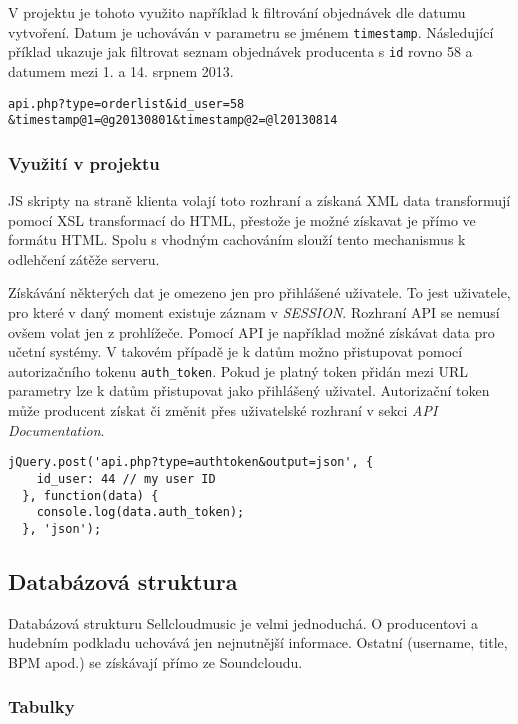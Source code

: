 \documentclass[12pt]{article}
\begin{document}
V projektu je tohoto využito například k filtrování objednávek dle datumu vytvoření. Datum je uchováván v parametru se jménem \verb|timestamp|. Následující příklad ukazuje jak filtrovat seznam objednávek producenta s \texttt{id} rovno 58 a datumem mezi 1. a 14. srpnem 2013.

\begin{lstlisting}
api.php?type=orderlist&id_user=58
&timestamp@1=@g20130801&timestamp@2=@l20130814
\end{lstlisting}

\subsubsection{Využití v projektu}

JS skripty na straně klienta volají toto rozhraní a získaná XML data transformují pomocí XSL transformací do HTML, přestože je možné získavat je přímo ve formátu HTML. Spolu s vhodným cachováním slouží tento mechanismus k odlehčení zátěže serveru.

Získávání některých dat je omezeno jen pro přihlášené uživatele. To jest uživatele, pro které v daný moment existuje záznam v \emph{SESSION}.
Rozhraní API se nemusí ovšem volat jen z prohlížeče. Pomocí API je například možné získávat data pro učetní systémy.
V takovém případě je k datům možno přistupovat pomocí autorizačního tokenu \texttt{auth\_token}. Pokud je platný token přidán mezi URL parametry lze k datům přistupovat jako přihlášený uživatel.
Autorizační token může producent získat či změnit přes uživatelské rozhraní v sekci \emph{API Documentation}.

\begin{lstlisting}[caption={Volání API pro vygenerování nového autorizačního tokenu}]
  jQuery.post('api.php?type=authtoken&output=json', {
    id_user: 44 // my user ID
  }, function(data) {
    console.log(data.auth_token);
  }, 'json');
\end{lstlisting}

\subsection{Databázová struktura}

Databázová strukturu Sellcloudmusic je velmi jednoduchá. O producentovi a hudebním podkladu uchovává jen nejnutnější informace. Ostatní (username, title, BPM apod.) se získávají přímo ze Soundcloudu.

\subsubsection{Tabulky}
\end{document}
